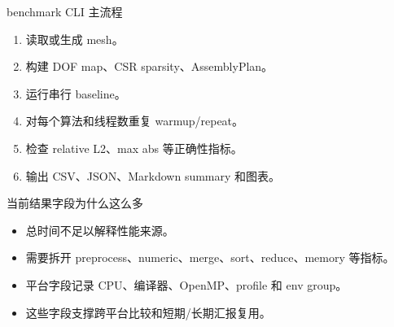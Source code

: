 \begin{frame}{benchmark CLI 主流程}
\begin{enumerate}
  \item 读取或生成 mesh。
  \item 构建 DOF map、CSR sparsity、AssemblyPlan。
  \item 运行串行 baseline。
  \item 对每个算法和线程数重复 warmup/repeat。
  \item 检查 relative L2、max abs 等正确性指标。
  \item 输出 CSV、JSON、Markdown summary 和图表。
\end{enumerate}
\end{frame}

\begin{frame}{当前结果字段为什么这么多}
\begin{itemize}
  \item 总时间不足以解释性能来源。
  \item 需要拆开 preprocess、numeric、merge、sort、reduce、memory 等指标。
  \item 平台字段记录 CPU、编译器、OpenMP、profile 和 env group。
  \item 这些字段支撑跨平台比较和短期/长期汇报复用。
\end{itemize}
\end{frame}
